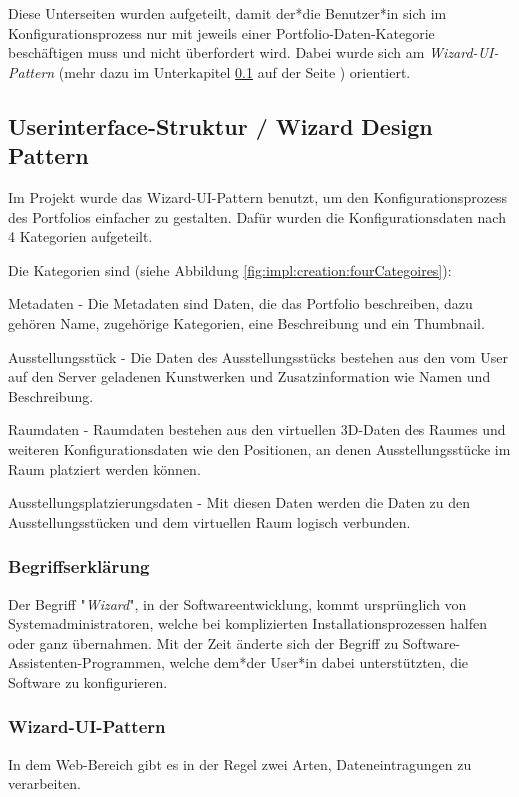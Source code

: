 Diese Unterseiten wurden aufgeteilt, damit der*die Benutzer*in sich im Konfigurationsprozess nur mit jeweils einer Portfolio-Daten-Kategorie beschäftigen muss und nicht überfordert wird. Dabei wurde sich  am \emph{Wizard-UI-Pattern} (mehr dazu im Unterkapitel \ref{sec::contentcreation::wizard} auf der Seite \pageref{sec::contentcreation::wizard}) orientiert.

\subsection{Userinterface-Struktur / Wizard Design Pattern}
\label{sec::contentcreation::wizard}
Im Projekt wurde das Wizard-UI-Pattern benutzt, um den Konfigurationsprozess des Portfolios einfacher zu gestalten. Dafür wurden die Konfigurationsdaten nach 4 Kategorien aufgeteilt.

Die Kategorien sind (siehe Abbildung \ref{fig:impl:creation:fourCategoires}):
\begin{compactitem}
\item Metadaten - Die Metadaten sind Daten, die das Portfolio beschreiben, dazu gehören Name, zugehörige Kategorien, eine Beschreibung und ein Thumbnail.
\item Ausstellungsstück - Die Daten des Ausstellungsstücks bestehen aus den vom User auf den Server geladenen Kunstwerken und Zusatzinformation wie Namen und Beschreibung.
\item Raumdaten - Raumdaten bestehen aus den virtuellen 3D-Daten des Raumes und weiteren Konfigurationsdaten wie den Positionen, an denen Ausstellungsstücke im Raum platziert werden können.
\item Ausstellungsplatzierungsdaten - Mit diesen Daten werden die Daten zu den Ausstellungsstücken und dem virtuellen Raum logisch verbunden.
\end{compactitem}

\subsubsection*{Begriffserklärung}
Der Begriff "\emph{Wizard}", in der Softwareentwicklung, kommt ursprünglich von Systemadministratoren, welche bei komplizierten Installationsprozessen halfen oder ganz übernahmen. Mit der Zeit änderte sich der Begriff zu Software-Assistenten-Programmen, welche dem*der User*in dabei unterstützten, die Software zu konfigurieren. \cite[Ursprung des Begriffs Wizard]{OrigionOfWizards}

\subsubsection{Wizard-UI-Pattern}
In dem Web-Bereich gibt es in der Regel zwei Arten, Dateneintragungen zu verarbeiten.

